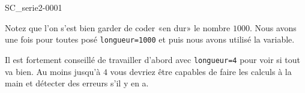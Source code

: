\begin{corrige}{SC_serie2-0001}



Notez que l'on s'est bien garder de coder «en dur» le nombre $1000$. Nous avons une fois pour toutes posé \verb+longueur=1000+ et puis nous avons utilisé la variable.

Il est fortement conseillé de travailler d'abord avec \verb+longueur=4+ pour voir si tout
  va bien. Au moins jusqu'à $4$ vous devriez être capables de faire les calculs à la main
  et détecter des erreurs s'il y en a.

\end{corrige}
